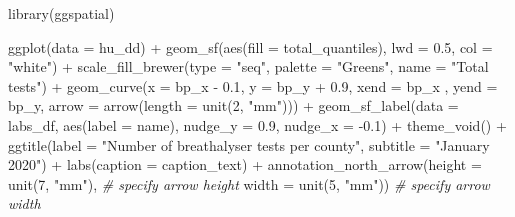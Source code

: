 \documentclass[
]{book}
\makeatletter
\newenvironment{Shaded}{\begin{snugshade}}{\end{snugshade}}
\newcommand{\AttributeTok}[1]{\textcolor[rgb]{0.61,0.61,0.61}{#1}}
\newcommand{\CommentTok}[1]{\textcolor[rgb]{0.37,0.37,0.37}{\textit{#1}}}
\newcommand{\DecValTok}[1]{\textcolor[rgb]{0.06,0.06,0.06}{#1}}
\newcommand{\FloatTok}[1]{\textcolor[rgb]{0.06,0.06,0.06}{#1}}
\newcommand{\FunctionTok}[1]{\textcolor[rgb]{0,0,0}{#1}}
\newcommand{\NormalTok}[1]{#1}
\newcommand{\SpecialCharTok}[1]{\textcolor[rgb]{0,0,0}{#1}}
\newcommand{\StringTok}[1]{\textcolor[rgb]{0.5,0.5,0.5}{#1}}
\newenvironment{kframe}{%
\medskip{}
\setlength{\fboxsep}{.8em}
 \def\at@end@of@kframe{}%
 \ifinner\ifhmode%
  \def\at@end@of@kframe{\end{minipage}}%
  \begin{minipage}{\columnwidth}%
 \fi\fi%
 \def\FrameCommand##1{\hskip\@totalleftmargin \hskip-\fboxsep
 \colorbox{shadecolor}{##1}\hskip-\fboxsep
     \hskip-\linewidth \hskip-\@totalleftmargin \hskip\columnwidth}%
 \MakeFramed {\advance\hsize-\width
   \@totalleftmargin\z@ \linewidth\hsize
   \@setminipage}}%
 {\par\unskip\endMakeFramed%
 \at@end@of@kframe}
\renewenvironment{Shaded}{\begin{kframe}}{\end{kframe}}
\makeatother
\begin{document}
\begin{Shaded}
\begin{Highlighting}[]
\FunctionTok{library}\NormalTok{(ggspatial)}

\FunctionTok{ggplot}\NormalTok{(}\AttributeTok{data =}\NormalTok{ hu\_dd) }\SpecialCharTok{+} 
  \FunctionTok{geom\_sf}\NormalTok{(}\FunctionTok{aes}\NormalTok{(}\AttributeTok{fill =}\NormalTok{ total\_quantiles), }
          \AttributeTok{lwd =} \FloatTok{0.5}\NormalTok{, }\AttributeTok{col =} \StringTok{"white"}\NormalTok{) }\SpecialCharTok{+} 
  \FunctionTok{scale\_fill\_brewer}\NormalTok{(}\AttributeTok{type =} \StringTok{"seq"}\NormalTok{, }
                    \AttributeTok{palette =} \StringTok{"Greens"}\NormalTok{, }
                    \AttributeTok{name =} \StringTok{"Total tests"}\NormalTok{) }\SpecialCharTok{+} 
  \FunctionTok{geom\_curve}\NormalTok{(}\AttributeTok{x =}\NormalTok{ bp\_x }\SpecialCharTok{{-}} \FloatTok{0.1}\NormalTok{, }
             \AttributeTok{y =}\NormalTok{ bp\_y }\SpecialCharTok{+} \FloatTok{0.9}\NormalTok{, }
             \AttributeTok{xend =}\NormalTok{ bp\_x , }
             \AttributeTok{yend =}\NormalTok{ bp\_y, }
             \AttributeTok{arrow =} \FunctionTok{arrow}\NormalTok{(}\AttributeTok{length =} \FunctionTok{unit}\NormalTok{(}\DecValTok{2}\NormalTok{, }\StringTok{"mm"}\NormalTok{))) }\SpecialCharTok{+}
  \FunctionTok{geom\_sf\_label}\NormalTok{(}\AttributeTok{data =}\NormalTok{ labs\_df, }
                \FunctionTok{aes}\NormalTok{(}\AttributeTok{label =}\NormalTok{ name), }
                \AttributeTok{nudge\_y =} \FloatTok{0.9}\NormalTok{, }
                \AttributeTok{nudge\_x =} \SpecialCharTok{{-}}\FloatTok{0.1}\NormalTok{) }\SpecialCharTok{+} 
  \FunctionTok{theme\_void}\NormalTok{() }\SpecialCharTok{+} 
  \FunctionTok{ggtitle}\NormalTok{(}\AttributeTok{label =} \StringTok{"Number of breathalyser tests per county"}\NormalTok{, }
          \AttributeTok{subtitle =} \StringTok{"January 2020"}\NormalTok{) }\SpecialCharTok{+} 
  \FunctionTok{labs}\NormalTok{(}\AttributeTok{caption =}\NormalTok{ caption\_text) }\SpecialCharTok{+} 
  \FunctionTok{annotation\_north\_arrow}\NormalTok{(}\AttributeTok{height =} \FunctionTok{unit}\NormalTok{(}\DecValTok{7}\NormalTok{, }\StringTok{"mm"}\NormalTok{), }\CommentTok{\# specify arrow height}
                         \AttributeTok{width =} \FunctionTok{unit}\NormalTok{(}\DecValTok{5}\NormalTok{, }\StringTok{"mm"}\NormalTok{)) }\CommentTok{\# specify arrow width}
\end{Highlighting}
\end{Shaded}
\end{document}
